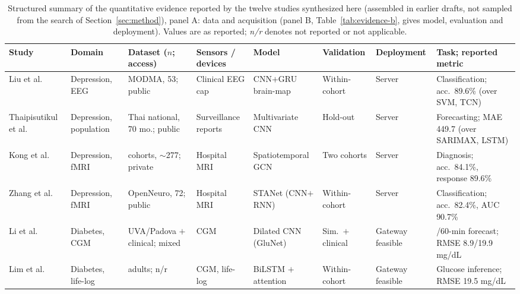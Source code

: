 \documentclass[journal]{IEEEtran}
\newif\ifsubmission
\begin{document}
\begin{table}[t]
\centering
\caption{Structured summary of the quantitative evidence reported by the twelve studies synthesized here (assembled in earlier drafts, not sampled from the search of Section~\ref{sec:method})\ifsubmission\else, panel A: data and acquisition (panel B, Table~\ref{tab:evidence-b}, gives model, evaluation and deployment)\fi. Values are as reported; \emph{n/r} denotes not reported or not applicable.}
\label{tab:evidence}
\ifsubmission
\scriptsize
\setlength{\tabcolsep}{2.5pt}
\renewcommand{\arraystretch}{1.08}
\begin{tabularx}{\textwidth}{>{\raggedright\arraybackslash}p{1.9cm} >{\raggedright\arraybackslash}p{1.6cm} >{\raggedright\arraybackslash}p{2.2cm} >{\raggedright\arraybackslash}p{1.6cm} >{\raggedright\arraybackslash}p{1.9cm} >{\raggedright\arraybackslash}p{1.4cm} >{\raggedright\arraybackslash}p{1.7cm} >{\raggedright\arraybackslash}X}
\toprule
\textbf{Study} & \textbf{Domain} & \textbf{Dataset ($n$; access)} & \textbf{Sensors / devices} & \textbf{Model} & \textbf{Validation} & \textbf{Deployment} & \textbf{Task; reported metric} \\
\midrule
Liu et al.~\cite{2} & Depression, EEG & MODMA, 53; public & Clinical EEG cap & CNN$+$GRU brain-map & Within-cohort & Server & Classification; acc.\ 89.6\% (over SVM, TCN) \\
\addlinespace[1pt]
Thaipisutikul et al.~\cite{3} & Depression, population & Thai national, 70 mo.; public & Surveillance reports & Multivariate CNN & Hold-out & Server & Forecasting; MAE 449.7 (over SARIMAX, LSTM) \\
\addlinespace[1pt]
Kong et al.~\cite{4} & Depression, fMRI & 2 cohorts, $\sim$277; private & Hospital MRI & Spatiotemporal GCN & Two cohorts & Server & Diagnosis; acc.\ 84.1\%, response 89.6\% \\
\addlinespace[1pt]
Zhang et al.~\cite{9} & Depression, fMRI & OpenNeuro, 72; public & Hospital MRI & STANet (CNN$+$RNN) & Within-cohort & Server & Classification; acc.\ 82.4\%, AUC 90.7\% \\
\addlinespace[1pt]
Li et al.~\cite{Li2020GluNet} & Diabetes, CGM & UVA/Padova $+$ clinical; mixed & CGM & Dilated CNN (GluNet) & Sim.\ $+$ clinical & Gateway feasible & 30/60-min forecast; RMSE 8.9/19.9 mg/dL \\
\addlinespace[1pt]
Lim et al.~\cite{Lim2025VirtualCGM} & Diabetes, life-log & 171 adults; n/r & CGM, life-log & BiLSTM $+$ attention & Within-cohort & Gateway feasible & Glucose inference; RMSE 19.5 mg/dL \\

\end{tabularx}
\end{table}
\end{document}
